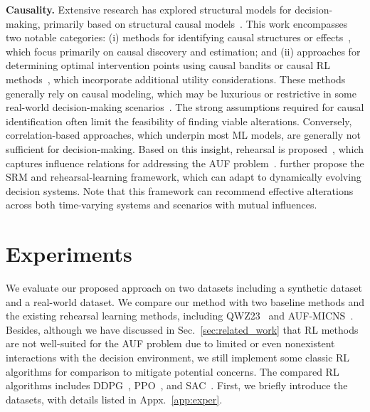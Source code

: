 \documentclass{article}
\theoremstyle{plain}
\theoremstyle{definition}
\def \Sec {Sec.}
\begin{document}
\textbf{Causality.} Extensive research has explored structural models for decision-making, primarily based on structural causal models~\citep{spirtes2000causation}. This work encompasses two notable categories: (i) methods for identifying causal structures or effects~\citep{KocaogluDV17, wang2020cost, wang2023sound, qint2021ate, wang2023estimating, zhang2023active, qin2024tracking}, which focus primarily on causal discovery and estimation; and (ii) approaches for determining optimal intervention points using causal bandits or causal RL methods~\citep{latt2016causalbandit, sen2017identifying, lee2018structural, zhang2019RL, LuMT21, park2025structural}, which incorporate additional utility considerations. 
These methods generally rely on causal modeling, which may be luxurious or restrictive in some real-world decision-making scenarios~\citep{zhouzh2022rehearsal}. 
The strong assumptions required for causal identification often limit the feasibility of finding viable alterations. 
Conversely, correlation-based approaches, which underpin most ML models, 
are generally not sufficient for decision-making.
Based on this insight, rehearsal is proposed~\citep{zhouzh2022rehearsal}, which captures influence relations for addressing the AUF problem~\citep{zhouzh2023influence}. \citet{qint2023srm} further 
propose the SRM and rehearsal-learning framework, which can adapt to dynamically evolving decision systems. 
Note that this framework can 
recommend effective alterations across both time-varying systems and scenarios with mutual influences.

\section{Experiments}

We evaluate our proposed approach on two datasets including a synthetic dataset and a real-world dataset. 
We compare our method with two baseline methods and the existing rehearsal learning methods, including QWZ23~\citep{qint2023srm} and AUF-MICNS~\citep{du2024micns}. 
Besides, although we have discussed in \Sec~\ref{sec:related_work} that RL methods are not well-suited for the AUF problem due to limited or even nonexistent interactions with the decision environment, we still implement some classic RL algorithms for comparison to mitigate potential concerns.
The compared RL algorithms includes DDPG~\citep{Lillicrap2016ddpg},  PPO~\citep{John2017PPO}, and SAC~\citep{haarnoja2018SAC}. 
First, we briefly introduce the datasets, with details listed in Appx.~\ref{app:exper}.
\end{document}
